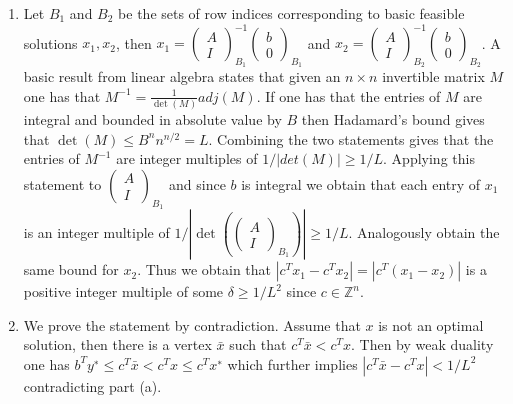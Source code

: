 \documentclass[11pt]{article}
\newcommand{\setZ}{\mathbb{Z}}
\begin{document}
\begin{enumerate}[1)]
\begin{solution}
\begin{enumerate}
\item  Let $B_1$ and $B_2$ be the sets of row indices corresponding to basic feasible solutions $x_1,x_2$, then
$x_1 = \begin{pmatrix} A \\ I \end{pmatrix}_{B_1}^{-1} \begin{pmatrix} b \\ 0 \end{pmatrix}_{B_1}$ and $x_2 = \begin{pmatrix} A \\ I \end{pmatrix}_{B_2}^{-1} \begin{pmatrix} b \\ 0 \end{pmatrix}_{B_2}$.  A basic result from linear algebra states that given an $n×n$ invertible matrix $M$ one has that $M^{−1} =\frac{1}{\det(M)}adj(M)$. If one has that the entries of $M$ are integral and bounded in absolute value by $B$ then Hadamard’s bound gives that $\det(M) ≤ B^n n^{n/2} = L$. Combining the two statements gives that the entries of $M^{−1}$ are integer multiples of
$1/ |det(M)|≥1/L$.  Applying this statement to $\begin{pmatrix} A \\ I \end{pmatrix}_{B_1}$ and since $b$ is integral we obtain that each entry of $x_1$ is an integer multiple of $1/\left|\det\left( \begin{pmatrix} A \\ I \end{pmatrix}_{B_1}\right)\right|≥1/L$. Analogously obtain the same bound for $x_2$. Thus we obtain that $|c^Tx_1−c^Tx_2|= |c^T(x_1−x_2)|$ is a positive integer multiple of some $\delta  ≥1/L^2$ since $c∈\setZ^n$.

\item  We prove the statement by contradiction. Assume that $x$ is not an optimal solution, then there
is a vertex $\bar{x}$ such that $c^T\bar{x}<c^Tx$. Then by weak duality one has $b^Ty^∗≤c^T\bar{x} <c^Tx ≤c^Tx^∗$ which further implies $|c^T\bar{x} −c^Tx|<1/L^2$ contradicting part (a).

\end{enumerate}


\end{solution}



\end{enumerate}
\end{document}
